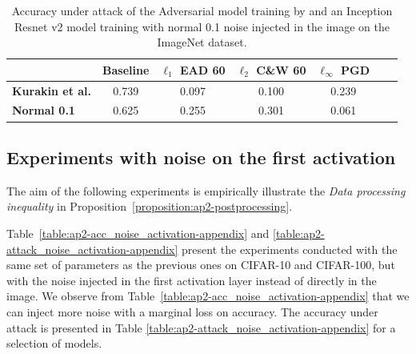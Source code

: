 \begin{table}[htb]
  \centering
  \caption{Accuracy under attack of the Adversarial model training by \citet{kurakin2016adversarial} and an Inception Resnet v2 model training with normal 0.1 noise injected in the image on the ImageNet dataset.}
  \label{table:ap2-adv_imagenet-appendix}
  \centering
  \begin{tabular}{lcccccc}
    \toprule
      & \textbf{Baseline} & \textbf{$\ell_1$ EAD 60} & \textbf{$\ell_2$ C\&W 60} & \textbf{$\ell_\infty$ PGD} \\
    \midrule
    \textbf{Kurakin et al. \cite{kurakin2016adversarial}} & 0.739 & 0.097 & 0.100 & 0.239 \\
    \textbf{Normal 0.1} & 0.625 & 0.255 & 0.301 & 0.061 \\
    \bottomrule
  \end{tabular}
\end{table}

\subsection{Experiments with noise on the first activation}

The aim of the following experiments is empirically illustrate the \textit{Data processing inequality} in Proposition~\ref{proposition:ap2-postprocessing}.

Table~\ref{table:ap2-acc_noise_activation-appendix} and \ref{table:ap2-attack_noise_activation-appendix} present the experiments conducted with the same set of parameters as the previous ones  on CIFAR-10 and CIFAR-100, but with the noise injected in the first activation layer instead of directly in the image. We observe from  Table~\ref{table:ap2-acc_noise_activation-appendix} that we can inject more noise with a marginal loss on accuracy. The accuracy under attack is presented in Table \ref{table:ap2-attack_noise_activation-appendix} for a selection of models. 

